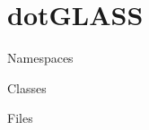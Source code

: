 \chapter{dot\+GLASS}
\hypertarget{index}{}\label{index}

\begin{DoxyItemize}
\item Namespaces
\item Classes
\item Files 
\end{DoxyItemize}